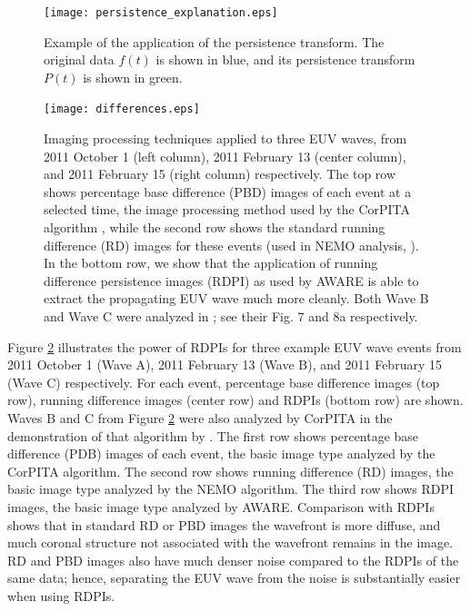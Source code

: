 \begin{figure}
\begin{center}
\texttt{[image: persistence\_explanation.eps]}
\caption{Example of the application of the persistence transform.  The
original data $f(t)$ is shown in blue, and its persistence transform
$P(t)$ is shown in green.}
\label{fig:persistence}
\end{center}
\end{figure}

\begin{figure}
\begin{center}
\texttt{[image: differences.eps]}
\caption{Imaging processing techniques applied to three EUV waves,
  from 2011 October 1 (left column), 2011 February 13 (center column),
  and 2011 February 15 (right column) respectively. The top row shows
  percentage base difference (PBD) images of each event at a selected
  time, the image processing method used by the CorPITA algorithm
  \citep{2014SoPh..289.3279L}, while the second row shows the standard running
  difference (RD) images for these events (used in NEMO analysis,
  \citep{2005SoPh..228..265P}). In the bottom row, we show that the
  application of running difference persistence images (RDPI) as used
  by AWARE is able to extract the propagating EUV wave much more
  cleanly. Both Wave B and Wave C were analyzed in
  \cite{2014SoPh..289.3279L}; see their Fig. 7 and 8a respectively.}
\label{rpdm_figure}
\end{center}
\end{figure}


Figure \ref{rpdm_figure} illustrates the power of RDPIs for three
example EUV wave events from 2011 October 1 (Wave A), 2011 February 13
(Wave B), and 2011 February 15 (Wave C) respectively. For each event,
percentage base difference images (top row), running difference images
(center row) and RDPIs (bottom row) are shown. Waves B and C from
Figure \ref{rpdm_figure} were also analyzed by CorPITA in the
demonstration of that algorithm by \citet{2014SoPh..289.3279L}.  The
first row shows percentage base difference (PDB) images of each event,
the basic image type analyzed by the CorPITA algorithm.  The second
row shows running difference (RD) images, the basic image type
analyzed by the NEMO algorithm.  The third row shows RDPI images, the
basic image type analyzed by AWARE. Comparison with RDPIs shows that
in standard RD or PBD images the wavefront is more diffuse, and much
coronal structure not associated with the wavefront remains in the
image. RD and PBD images also have much denser noise compared to the
RDPIs of the same data; hence, separating the EUV wave from the noise
is substantially easier when using RDPIs.

